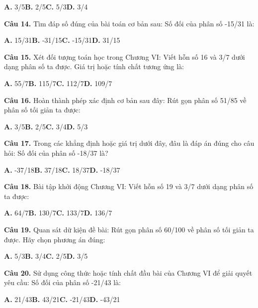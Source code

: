 \documentclass[11pt,a4paper]{article}
\begin{document}
\hspace*{1.5em}\textbf{A.} 3/5\quad\quad \textbf{B.} 2/5\quad\quad \textbf{C.} 5/3\quad\quad \textbf{D.} 3/4\par\vspace{2pt}
\textbf{\color{primary} Câu 14.} Tìm đáp số đúng của bài toán cơ bản sau: Số đối của phân số -15/31 là:\par
\hspace*{1.5em}\textbf{A.} 15/31\quad\quad \textbf{B.} -31/15\quad\quad \textbf{C.} -15/31\quad\quad \textbf{D.} 31/15\par\vspace{2pt}
\textbf{\color{primary} Câu 15.} Xét đối tượng toán học trong Chương VI: Viết hỗn số 16 và 3/7 dưới dạng phân số ta được. Giá trị hoặc tính chất tương ứng là:\par
\hspace*{1.5em}\textbf{A.} 55/7\quad\quad \textbf{B.} 115/7\quad\quad \textbf{C.} 112/7\quad\quad \textbf{D.} 109/7\par\vspace{2pt}
\textbf{\color{primary} Câu 16.} Hoàn thành phép xác định cơ bản sau đây: Rút gọn phân số 51/85 về phân số tối giản ta được:\par
\hspace*{1.5em}\textbf{A.} 3/5\quad\quad \textbf{B.} 2/5\quad\quad \textbf{C.} 3/4\quad\quad \textbf{D.} 5/3\par\vspace{2pt}
\textbf{\color{primary} Câu 17.} Trong các khẳng định hoặc giá trị dưới đây, đâu là đáp án đúng cho câu hỏi: Số đối của phân số -18/37 là?\par
\hspace*{1.5em}\textbf{A.} -37/18\quad\quad \textbf{B.} 37/18\quad\quad \textbf{C.} 18/37\quad\quad \textbf{D.} -18/37\par\vspace{2pt}
\textbf{\color{primary} Câu 18.} Bài tập khởi động Chương VI: Viết hỗn số 19 và 3/7 dưới dạng phân số ta được:\par
\hspace*{1.5em}\textbf{A.} 64/7\quad\quad \textbf{B.} 130/7\quad\quad \textbf{C.} 133/7\quad\quad \textbf{D.} 136/7\par\vspace{2pt}
\textbf{\color{primary} Câu 19.} Quan sát dữ kiện đề bài: Rút gọn phân số 60/100 về phân số tối giản ta được. Hãy chọn phương án đúng:\par
\hspace*{1.5em}\textbf{A.} 5/3\quad\quad \textbf{B.} 3/4\quad\quad \textbf{C.} 2/5\quad\quad \textbf{D.} 3/5\par\vspace{2pt}
\textbf{\color{primary} Câu 20.} Sử dụng công thức hoặc tính chất đầu bài của Chương VI để giải quyết yêu cầu: Số đối của phân số -21/43 là:\par
\hspace*{1.5em}\textbf{A.} 21/43\quad\quad \textbf{B.} 43/21\quad\quad \textbf{C.} -21/43\quad\quad \textbf{D.} -43/21\par\vspace{2pt}
\end{document}
